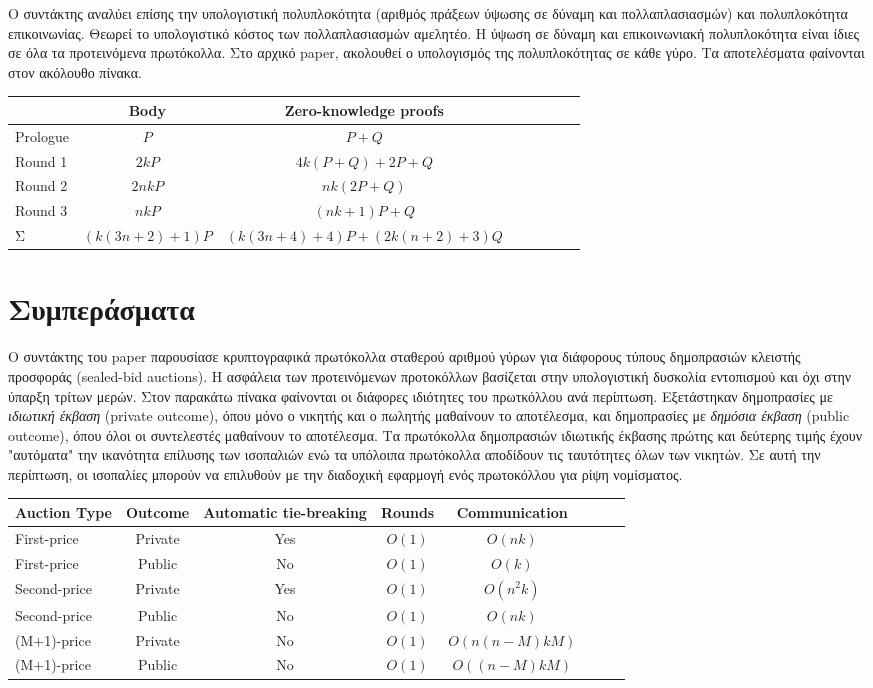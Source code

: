 \documentclass[letterpaper,11pt]{article}
\begin{document}
Ο συντάκτης αναλύει επίσης την υπολογιστική πολυπλοκότητα (αριθμός πράξεων ύψωσης σε δύναμη και πολλαπλασιασμών) και πολυπλοκότητα επικοινωνίας.
Θεωρεί το υπολογιστικό κόστος των πολλαπλασιασμών αμελητέο. Η ύψωση σε δύναμη και επικοινωνιακή πολυπλοκότητα είναι ίδιες σε όλα τα
προτεινόμενα πρωτόκολλα. Στο αρχικό paper, ακολουθεί ο υπολογισμός της πολυπλοκότητας σε κάθε γύρο. Τα αποτελέσματα φαίνονται στον ακόλουθο πίνακα.

\begin{center}
\begin{tabular}{l*{6}{c}r}
		& Body 	& Zero-knowledge proofs\\
	\hline
	Prologue	& $P$ 				& $P+Q$				\\
	Round 1		& $2kP$				& $4k(P+Q)+2P+Q$	\\
	Round 2		& $2nkP$			& $nk(2P+Q)$		\\
	Round 3		& $nkP$				& $(nk+1)P+Q$		\\
	Σ			& $(k(3n+2)+1)P$	& $(k(3n+4)+4)P+(2k(n+2)+3)Q$\\	
\end{tabular}
\end{center}


\section{Συμπεράσματα} Ο συντάκτης του paper παρουσίασε κρυπτογραφικά πρωτόκολλα σταθερού αριθμού γύρων για διάφορους τύπους δημοπρασιών κλειστής
προσφοράς (sealed-bid auctions). Η ασφάλεια των προτεινόμενων προτοκόλλων βασίζεται στην υπολογιστική δυσκολία εντοπισμού και όχι στην ύπαρξη
τρίτων μερών. Στον παρακάτω πίνακα φαίνονται οι διάφορες ιδιότητες του πρωτκόλλου ανά περίπτωση. Εξετάστηκαν δημοπρασίες με \emph{ιδιωτική έκβαση}
(private outcome), όπου μόνο ο νικητής και ο πωλητής μαθαίνουν το αποτέλεσμα, και δημοπρασίες με \emph{δημόσια έκβαση} (public outcome), όπου όλοι
οι συντελεστές μαθαίνουν το αποτέλεσμα. Τα πρωτόκολλα δημοπρασιών ιδιωτικής έκβασης πρώτης και δεύτερης τιμής έχουν "αυτόματα" την ικανότητα
επίλυσης των ισοπαλιών ενώ τα υπόλοιπα πρωτόκολλα αποδίδουν τις ταυτότητες όλων των νικητών. Σε αυτή την περίπτωση, οι ισοπαλίες μπορούν να
επιλυθούν με την διαδοχική εφαρμογή ενός πρωτοκόλλου για ρίψη νομίσματος.

\begin{center}
\begin{tabular}{l*{6}{c}r}
	Auction Type	& Outcome 	& Automatic tie-breaking 	& Rounds 	& Communication\\
	\hline
	First-price 	& Private	& Yes						& $O(1)$	& $O(nk)$\\
	First-price		& Public	& No						& $O(1)$	& $O(k)$\\
	Second-price	& Private	& Yes						& $O(1)$	& $O(n^2k)$\\
	Second-price    & Public	& No						& $O(1)$	& $O(nk)$\\
	(M+1)-price    	& Private	& No						& $O(1)$	& $O(n(n-M)kM)$\\
	(M+1)-price    	& Public	& No						& $O(1)$	& $O((n-M)kM)$\\
\end{tabular}
\end{center}
\end{document}
